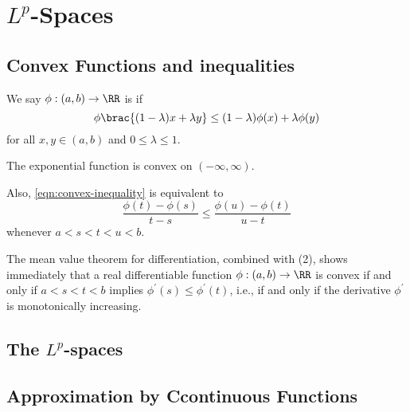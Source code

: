 \chapter{$L^p$-Spaces}
\section{Convex Functions and inequalities}
\begin{definition}
We say $\phi:(a,b)\to\RR$ is  if
\begin{equation}\label{eqn:convex-inequality}
\phi\brac{(1-\lambda)x+\lambda y}\le(1-\lambda)\phi(x)+\lambda\phi(y)
\end{equation}
for all $x,y\in(a,b)$ and $0\le\lambda\le1$.
\end{definition}


\begin{example}
The exponential function is convex on $(-\infty,\infty)$.
\end{example}

Also, \eqref{eqn:convex-inequality} is equivalent to
\[\frac{\phi(t)-\phi(s)}{t-s}\le\frac{\phi(u)-\phi(t)}{u-t}\]
whenever $a<s<t<u<b$.

The mean value theorem for differentiation, combined with (2), shows immediately that a real differentiable function $\phi:(a,b)\to\RR$ is convex if and only if $a<s<t<b$ implies $\phi^\prime(s)\le\phi^\prime(t)$, i.e., if and only if the derivative $\phi^\prime$ is monotonically increasing.

\begin{lemma}

\end{lemma}

\section{The $L^p$-spaces}


\section{Approximation by Ccontinuous Functions}
